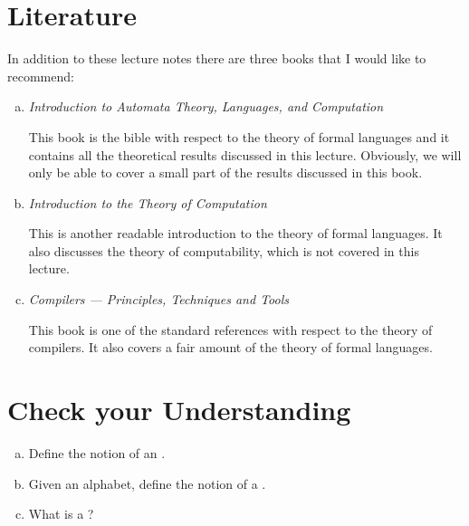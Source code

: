 \section{Literature}
In addition to these lecture notes there are three books that I would like to recommend:
\begin{enumerate}[(a)]
\item \emph{Introduction to Automata Theory, Languages, and Computation}
      \cite{hopcroft:06}

      This book is the bible with respect to the theory of formal languages and it contains all the theoretical
      results discussed in this lecture. 
      Obviously, we will only be able to cover a small part of the results discussed in this book.
\item \emph{Introduction to the Theory of Computation}
      \cite{sipser:2012}

      This is another readable introduction to the theory of formal languages.  It also discusses
      the theory of computability, which is not covered in this lecture.
\item \emph{Compilers --- Principles, Techniques and Tools}
      \cite{aho:2006}

      This book is one of the standard references with respect to the theory of compilers.  It also covers a fair amount of
      the theory of formal languages.
\end{enumerate}

\section{Check your Understanding}
\begin{enumerate}[(a)]
\item Define the notion of an .
\item Given an alphabet, define the notion of a .
\item What is a ?
\end{enumerate}


